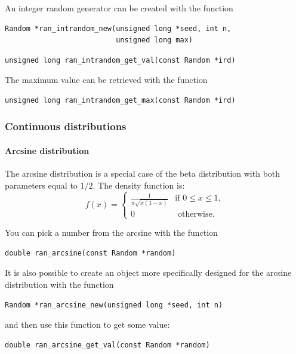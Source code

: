 An integer random generator can be created with the function
\begin{verbatim}
Random *ran_intrandom_new(unsigned long *seed, int n,
                          unsigned long max)
\end{verbatim}

\begin{verbatim}
unsigned long ran_intrandom_get_val(const Random *ird)
\end{verbatim}

The maximum value can be retrieved with the function
\begin{verbatim}
unsigned long ran_intrandom_get_max(const Random *ird)
\end{verbatim}

\subsubsection{Continuous distributions}


\paragraph{Arcsine distribution}

The arcsine distribution is a special case of the beta distribution with both parameters equal to $1/2$.
The density function is:
\[
f(x) =
\begin{cases}
\frac{1}{\pi\sqrt{x(1-x)}} & \text{if } 0\leq x \leq 1,\\
0 & \text{ otherwise}.
\end{cases}
\]

You can pick a number from the arcsine with the function
\begin{verbatim}
double ran_arcsine(const Random *random)
\end{verbatim}

It is also possible to create an object more specifically designed for the arcsine distribution with the function
\begin{verbatim}
Random *ran_arcsine_new(unsigned long *seed, int n)
\end{verbatim}
and then use this function to get some value:
\begin{verbatim}
double ran_arcsine_get_val(const Random *random)
\end{verbatim}


